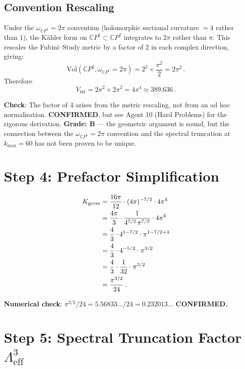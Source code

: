\documentclass[11pt,a4paper]{article}
\newcommand{\CP}{\mathbb{C}P}
\begin{document}
\subsection{Convention Rescaling}

Under the $\omega_{\CP^1} = 2\pi$ convention (holomorphic sectional curvature $= 4$ rather than $1$), the K\"ahler form on $\CP^1 \subset \CP^2$ integrates to $2\pi$ rather than $\pi$. This rescales the Fubini--Study metric by a factor of 2 in each complex direction, giving:
\begin{equation}
\mathrm{Vol}(\CP^2, \omega_{\CP^1}=2\pi) = 2^2 \times \frac{\pi^2}{2} = 2\pi^2\,.
\end{equation}
Therefore
\begin{equation}
V_{\mathrm{int}} = 2\pi^2 \times 2\pi^2 = 4\pi^4 \approx 389.636\,.
\end{equation}

\textbf{Check}: The factor of 4 arises from the metric rescaling, not from an ad hoc normalisation. \textbf{CONFIRMED}, but see Agent 10 (Hard Problems) for the rigorous derivation. \textbf{Grade: B} --- the geometric argument is sound, but the connection between the $\omega_{\CP^1} = 2\pi$ convention and the spectral truncation at $k_{\max} = 60$ has not been proven to be unique.

\section{Step 4: Prefactor Simplification}

\begin{align}
K_{\mathrm{geom}} &= \frac{16\pi}{12} \cdot (4\pi)^{-7/2} \cdot 4\pi^4 \notag\\
&= \frac{4\pi}{3} \cdot \frac{1}{4^{7/2}\,\pi^{7/2}} \cdot 4\pi^4 \notag\\
&= \frac{4}{3} \cdot 4^{1-7/2} \cdot \pi^{1-7/2+4} \notag\\
&= \frac{4}{3} \cdot 4^{-5/2} \cdot \pi^{3/2} \notag\\
&= \frac{4}{3} \cdot \frac{1}{32} \cdot \pi^{3/2} \notag\\
&= \frac{\pi^{3/2}}{24}\,.
\end{align}

\textbf{Numerical check}: $\pi^{3/2}/24 = 5.56833\ldots/24 = 0.232013\ldots$ \textbf{CONFIRMED.}

\section{Step 5: Spectral Truncation Factor $\Lambda^3_{\mathrm{eff}}$}
\end{document}
